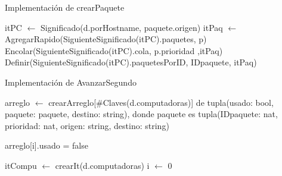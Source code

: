 \begin{Algoritmos}
\begin{algorithm}
\begin{algorithmic}[0]
\EndFunction
\end{algorithmic}
\end{algorithm}

\begin{algorithm}
\caption{Implementaci\'on de crearPaquete}
\begin{algorithmic}[0]
	\State itPC $\gets$ Significado(d.porHostname, paquete.origen)
	\State itPaq $\gets$ AgregarRapido(SiguienteSignificado(itPC).paquetes, p)
	\State Encolar(SiguienteSignificado(itPC).cola, p.prioridad ,itPaq)	
	\State Definir(SiguienteSignificado(itPC).paquetesPorID, IDpaquete, itPaq) 
\EndFunction
\end{algorithmic}
\end{algorithm}

\begin{algorithm}
\caption{Implementaci\'on de AvanzarSegundo}
\begin{algorithmic}[0]


	\State arreglo $\gets$ crearArreglo[$\#$Claves(d.computadoras)] de tupla(usado: bool, paquete: paquete, destino: string), donde paquete es tupla(IDpaquete: nat, prioridad: nat, origen: string, destino: string)
	\State {}
	
	 
	\State arreglo[i].usado = false 
	\EndFor
	
	
	\State itCompu $\gets$ crearIt(d.computadoras) 
	\State i $\gets$ 0
	

\end{algorithmic}
\end{algorithm}
\end{Algoritmos}
